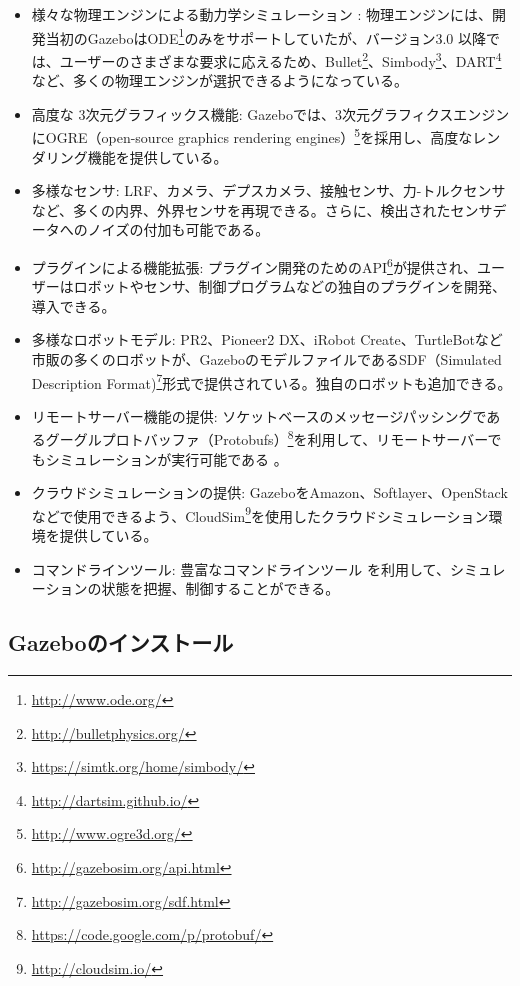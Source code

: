 \begin{itemize}
\begin{itemize}
\item 様々な物理エンジンによる動力学シミュレーション  : 物理エンジンには、開発当初のGazeboはODE\footnote{\url{http://www.ode.org/}}のみをサポートしていたが、バージョン3.0  以降では、ユーザーのさまざまな要求に応えるため、Bullet\footnote{\url{http://bulletphysics.org/}}、Simbody\footnote{\url{https://simtk.org/home/simbody/}}、DART\footnote{\url{http://dartsim.github.io/}}など、多くの物理エンジンが選択できるようになっている。
\item 高度な 3次元グラフィックス機能: Gazeboでは、3次元グラフィクスエンジンにOGRE（open-source graphics rendering engines）\footnote{\url{http://www.ogre3d.org/}}を採用し、高度なレンダリング機能を提供している。
\item  多様なセンサ:  LRF、カメラ、デプスカメラ、接触センサ、力-トルクセンサなど、多くの内界、外界センサを再現できる。さらに、検出されたセンサデータへのノイズの付加も可能である。
\item  プラグインによる機能拡張: プラグイン開発のためのAPI\footnote{\url{http://gazebosim.org/api.html}}が提供され、ユーザーはロボットやセンサ、制御プログラムなどの独自のプラグインを開発、導入できる。
\item  多様なロボットモデル: PR2、Pioneer2 DX、iRobot Create、TurtleBotなど市販の多くのロボットが、GazeboのモデルファイルであるSDF（Simulated Description Format)\footnote{\url{http://gazebosim.org/sdf.html}}形式で提供されている。独自のロボットも追加できる。
\item  リモートサーバー機能の提供: ソケットベースのメッセージパッシングであるグーグルプロトバッファ（Protobufs）\footnote{\url{https://code.google.com/p/protobuf/}}を利用して、リモートサーバーでもシミュレーションが実行可能である  。
\item  クラウドシミュレーションの提供: GazeboをAmazon、Softlayer、OpenStackなどで使用できるよう、CloudSim\footnote{\url{http://cloudsim.io/}}を使用したクラウドシミュレーション環境を提供している。
\item コマンドラインツール: 豊富なコマンドラインツール  を利用して、シミュレーションの状態を把握、制御することができる。
\end{itemize}

\subsection{Gazeboのインストール}


\end{itemize}
